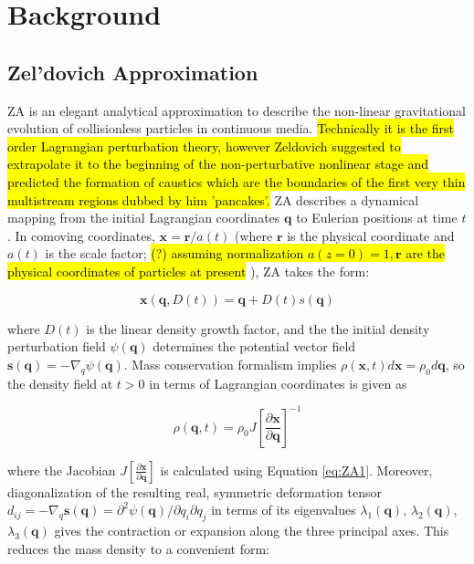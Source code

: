 \chapter{Background}

\section{Zel'dovich Approximation}

\label{sec:ZA}

ZA is an elegant analytical approximation to describe the non-linear gravitational evolution of collisionless particles in continuous media. \hl{Technically it is the first order Lagrangian perturbation theory, however Zeldovich suggested to extrapolate it to the beginning of the non-perturbative nonlinear stage and predicted the formation of caustics which are the boundaries of
the first very thin multistream regions dubbed by him  'pancakes'.}
ZA describes a dynamical mapping from the initial Lagrangian coordinates $\mathbf{q}$ to Eulerian positions at time $t$. In comoving coordinates, $\mathbf{x} = \mathbf{r}/a(t)$ (where $\mathbf{r}$ is the physical coordinate  and $a(t)$ is the scale factor; \hl{(?) assuming normalization $a(z=0)=1, \mathbf{r}$ are 
the physical coordinates of particles at present} ), ZA takes the form:

\begin{equation} \label{eq:ZA1}
 \mathbf{x}(\mathbf{q}, D(t) ) = \mathbf{q} + D(t) s(\mathbf{q}) 
\end{equation}

where $D(t)$ is the linear density growth factor, and the the initial density perturbation field $\psi(\mathbf{q})$ determines the potential vector field $\mathbf{s(q)} = - \nabla_q \psi(\mathbf{q})$. 
Mass conservation formalism implies $\rho(\mathbf{x}, t) d\mathbf{x} = \rho_0 d\mathbf{q} $, so the density field at $t>0$ in terms of Lagrangian coordinates is given as 

\begin{equation}
 \rho(\mathbf{q}, t) = \rho_0 J \left[ \frac{\partial\mathbf{x}}{\partial\mathbf{q}} \right]^{-1}
\end{equation}

where the Jacobian $J \left[ \frac{\partial\mathbf{x}}{\partial\mathbf{q}} \right]$ is calculated using Equation \ref{eq:ZA1}. Moreover, diagonalization of the resulting real, symmetric deformation tensor $d_{ij} = - \nabla_q \mathbf{s(q)} =  \partial^2 \psi(\mathbf{q})/ \partial q_i \partial q_j$ in terms of its eigenvalues $\lambda_1(\mathbf{q})$, $\lambda_2(\mathbf{q})$, $\lambda_3(\mathbf{q})$ gives the contraction or expansion along the three principal axes. This reduces the mass density to a convenient form:

